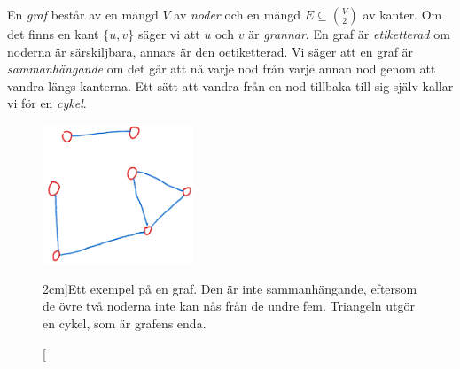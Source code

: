 \documentclass[nobib]{tufte-handout}
\begin{document}
\begin{definition}
    En \emph{graf} består av en mängd $V$ av \emph{noder} och en mängd $E \subseteq \binom{V}{2}$ av kanter. Om det finns en kant $\{u,v\}$ säger vi att $u$ och $v$ är \emph{grannar}. En graf är \emph{etiketterad} om noderna är särskiljbara, annars är den oetiketterad.
    Vi säger att en graf är \emph{sammanhängande} om det går att nå varje nod från varje annan nod genom att vandra längs kanterna. Ett sätt att vandra från en nod tillbaka till sig själv kallar vi för en \emph{cykel}.

    \begin{figure}
        \centering
        \includegraphics[width=0.4\textwidth]{graphics/example_graph.png}
        \caption[][2cm]{Ett exempel på en graf. Den är inte sammanhängande, eftersom de övre två noderna inte kan nås från de undre fem. Triangeln utgör en cykel, som är grafens enda.}
    \end{figure}
\end{definition}
\end{document}
